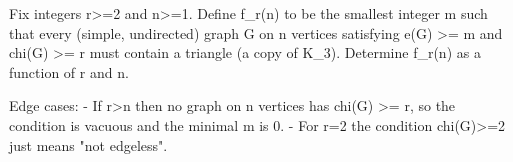 Fix integers r>=2 and n>=1. Define f_r(n) to be the smallest integer m such that every (simple, undirected) graph G on n vertices satisfying
  e(G) >= m  and  chi(G) >= r
must contain a triangle (a copy of K_3).
Determine f_r(n) as a function of r and n.

Edge cases:
- If r>n then no graph on n vertices has chi(G) >= r, so the condition is vacuous and the minimal m is 0.
- For r=2 the condition chi(G)>=2 just means "not edgeless".
